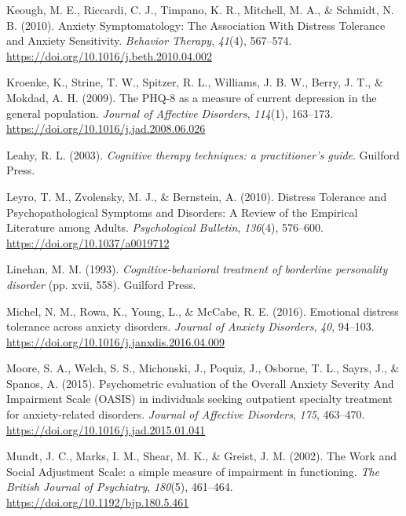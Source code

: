 \documentclass[
  man,floatsintext]{apa7}
\newlength{\cslhangindent}
\newlength{\cslentryspacingunit} %
\newenvironment{CSLReferences}[2] %
 {%
  \setlength{\parindent}{0pt}
  \ifodd #1
  \let\oldpar\par
  \def\par{\hangindent=\cslhangindent\oldpar}
  \fi
  \setlength{\parskip}{#2\cslentryspacingunit}
 }%
 {}
\begin{document}
\begin{CSLReferences}{1}{0}
\leavevmode{}%
Keough, M. E., Riccardi, C. J., Timpano, K. R., Mitchell, M. A., \& Schmidt, N. B. (2010). Anxiety Symptomatology: The Association With Distress Tolerance and Anxiety Sensitivity. \emph{Behavior Therapy}, \emph{41}(4), 567--574. \url{https://doi.org/10.1016/j.beth.2010.04.002}

\leavevmode{}%
Kroenke, K., Strine, T. W., Spitzer, R. L., Williams, J. B. W., Berry, J. T., \& Mokdad, A. H. (2009). The PHQ-8 as a measure of current depression in the general population. \emph{Journal of Affective Disorders}, \emph{114}(1), 163--173. \url{https://doi.org/10.1016/j.jad.2008.06.026}

\leavevmode{}%
Leahy, R. L. (2003). \emph{Cognitive therapy techniques: a practitioner's guide}. Guilford Press.

\leavevmode{}%
Leyro, T. M., Zvolensky, M. J., \& Bernstein, A. (2010). Distress Tolerance and Psychopathological Symptoms and Disorders: A Review of the Empirical Literature among Adults. \emph{Psychological Bulletin}, \emph{136}(4), 576--600. \url{https://doi.org/10.1037/a0019712}

\leavevmode{}%
Linehan, M. M. (1993). \emph{Cognitive-behavioral treatment of borderline personality disorder} (pp. xvii, 558). Guilford Press.

\leavevmode{}%
Michel, N. M., Rowa, K., Young, L., \& McCabe, R. E. (2016). Emotional distress tolerance across anxiety disorders. \emph{Journal of Anxiety Disorders}, \emph{40}, 94--103. \url{https://doi.org/10.1016/j.janxdis.2016.04.009}

\leavevmode{}%
Moore, S. A., Welch, S. S., Michonski, J., Poquiz, J., Osborne, T. L., Sayrs, J., \& Spanos, A. (2015). Psychometric evaluation of the Overall Anxiety Severity And Impairment Scale (OASIS) in individuals seeking outpatient specialty treatment for anxiety-related disorders. \emph{Journal of Affective Disorders}, \emph{175}, 463--470. \url{https://doi.org/10.1016/j.jad.2015.01.041}

\leavevmode{}%
Mundt, J. C., Marks, I. M., Shear, M. K., \& Greist, J. M. (2002). The Work and Social Adjustment Scale: a simple measure of impairment in functioning. \emph{The British Journal of Psychiatry}, \emph{180}(5), 461--464. \url{https://doi.org/10.1192/bjp.180.5.461}


\end{CSLReferences}
\end{document}
